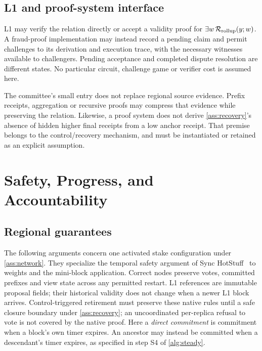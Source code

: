 \documentclass[11pt,a4paper,onecolumn]{article}
\begin{document}
\subsection{L1 and proof-system interface}
L1 may verify the relation directly or accept a validity proof for
$\exists w\,\mathcal R_{\rm rollup}(y;w)$. A fraud-proof implementation may
instead record a pending claim and permit challenges to its derivation and
execution trace, with the necessary witnesses available to challengers.
Pending acceptance and completed dispute resolution are different states.
No particular circuit, challenge game or verifier cost is assumed here.

The committee's small entry does not replace regional source evidence.
Prefix receipts, aggregation or recursive proofs may compress that evidence
while preserving the relation. Likewise, a proof system does not derive
\cref{ass:recovery}'s absence of hidden higher final receipts from a low
anchor receipt. That premise belongs to the control/recovery mechanism,
and must be instantiated or retained as an explicit assumption.

\section{Safety, Progress, and Accountability}\label{sec:security}
\subsection{Regional guarantees}
The following arguments concern one activated stake configuration under
\cref{ass:network}. They specialize the temporal safety argument of
Sync HotStuff~\cite{synchotstuff} to weights and the mini-block application.
Correct nodes preserve votes, committed prefixes and view state across any
permitted restart. L1 references are immutable proposal fields; their
historical validity does not change when a newer L1 block arrives.
Control-triggered retirement must preserve these native rules until a
safe closure boundary under \cref{ass:recovery}; an uncoordinated
per-replica refusal to vote is not covered by the native proof.
Here a \emph{direct commitment} is commitment when a block's own timer
expires. An ancestor may instead be committed when a descendant's timer
expires, as specified in step S4 of \cref{alg:steady}.
\end{document}
